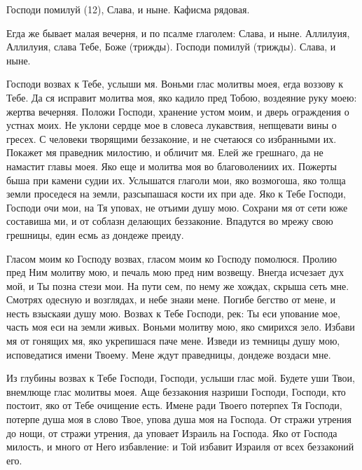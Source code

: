 Господи помилуй (12), Слава, и ныне. Кафисма рядовая.

Егда же бывает малая вечерня, и по псалме глаголем: Слава, и ныне. Аллилуия, Аллилуия, слава Тебе, Боже (трижды). Господи помилуй (трижды). Слава, и ныне.




Господи возвах к Тебе, услыши мя. Воньми глас молитвы моея, егда воззову к Тебе. Да ся исправит молитва моя, яко кадило пред Тобою, воздеяние руку моею: жертва вечерняя. Положи Господи, хранение устом моим, и дверь ограждения о устнах моих. Не уклони сердце мое в словеса лукавствия, непщевати вины о гресех. С человеки творящими беззаконие, и не счетаюся со избранными их. Покажет мя праведник милостию, и обличит мя. Елей же грешнаго, да не намастит главы моея. Яко еще и молитва моя во благоволениих их. Пожерты быша при камени судии их. Услышатся глаголи мои, яко возмогоша, яко толща земли проседеся на земли, разсыпашася кости их при аде. Яко к Тебе Господи, Господи очи мои, на Тя уповах, не отъими душу мою. Сохрани мя от сети юже составиша ми, и от соблазн делающих беззаконие. Впадутся во мрежу свою грешницы, един есмь аз дондеже преиду.




Гласом моим ко Господу возвах, гласом моим ко Господу помолюся. Пролию пред Ним молитву мою, и печаль мою пред ним возвещу. Внегда исчезает дух мой, и Ты позна стези мои. На пути сем, по нему же хождах, скрыша сеть мне. Смотрях одесную и возглядах, и небе знаяи мене. Погибе бегство от мене, и несть взыскаяи душу мою. Возвах к Тебе Господи, рек: Ты еси упование мое, часть моя еси на земли живых. Воньми молитву мою, яко смирихся зело. Избави мя от гонящих мя, яко укрепишася паче мене. Изведи из темницы душу мою, исповедатися имени Твоему. Мене ждут праведницы, дондеже воздаси мне.




Из глубины возвах к Тебе Господи, Господи, услыши глас мой. Будете уши Твои, внемлюще глас молитвы моея. Аще беззакония назриши Господи, Господи, кто постоит, яко от Тебе очищение есть. Имене ради Твоего потерпех Тя Господи, потерпе душа моя в слово Твое, упова душа моя на Господа. От стражи утрения до нощи, от стражи утрения, да уповает Израиль на Господа. Яко от Господа милость, и много от Него избавление: и Той избавит Израиля от всех беззаконий его.




